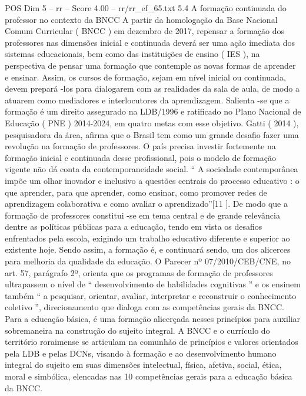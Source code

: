 \begin{textsample}{POS Dim 5 – rr – Score 4.00 – rr/rr\_ef\_65.txt}  \label{ex:f5_pos_228}
5.4 A formação continuada do professor no contexto da BNCC A partir da homologação da Base Nacional Comum Curricular ( BNCC ) em dezembro de 2017, repensar a formação dos professores nas dimensões inicial e continuada deverá ser uma ação imediata dos sistemas educacionais, bem como das instituições de ensino ( IES ), na perspectiva de pensar uma formação que contemple as novas formas de aprender e ensinar.
Assim, os cursos de formação, sejam em nível inicial ou continuada, devem prepará -los para dialogarem com as realidades da sala de aula, de modo a atuarem como mediadores e interlocutores da aprendizagem.
Salienta -se que a formação é um direito assegurado na LDB/1996 e ratificado no Plano Nacional de Educação ( PNE ) 2014-2024, em quatro metas com esse objetivo.
Gatti ( 2014 ), pesquisadora da área, afirma que o Brasil tem como um grande desafio fazer uma revolução na formação de professores.
O país precisa investir fortemente na formação inicial e continuada desse profissional, pois o modelo de formação vigente não dá conta da contemporaneidade social. “ A sociedade contemporânea impõe um olhar inovador e inclusivo a questões centrais do processo educativo : o que aprender, para que aprender, como ensinar, como promover redes de aprendizagem colaborativa e como avaliar o aprendizado”[11 ].
De modo que a formação de professores constitui -se em tema central e de grande relevância dentre as políticas públicas para a educação, tendo em vista os desafios enfrentados pela escola, exigindo um trabalho educativo diferente e superior ao existente hoje.
Sendo assim, a formação é, e continuará sendo, um dos alicerces para melhoria da qualidade da educação.
O Parecer nº 07/2010/CEB/CNE, no art. 57, parágrafo 2º, orienta que os programas de formação de professores ultrapassem o nível de “ desenvolvimento de habilidades cognitivas ” e os ensinem também “ a pesquisar, orientar, avaliar, interpretar e reconstruir o conhecimento coletivo ”, direcionamento que dialoga com as competências gerais da BNCC.
Para a educação básica, é uma formação alicerçada nesses princípios para auxiliar sobremaneira na construção do sujeito integral.
A BNCC e o currículo do território roraimense se articulam na comunhão de princípios e valores orientados pela LDB e pelas DCNs, visando à formação e ao desenvolvimento humano integral do sujeito em suas dimensões intelectual, física, afetiva, social, ética, moral e simbólica, elencadas nas 10 competências gerais para a educação básica da BNCC.

\end{textsample}
